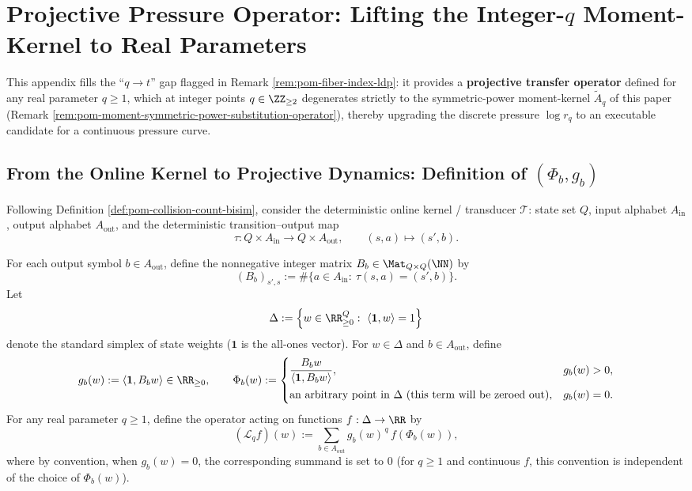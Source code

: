 \section{Projective Pressure Operator: Lifting the Integer-\texorpdfstring{$q$}{q} Moment-Kernel to Real Parameters}\label{app:pom-projective-pressure-operator}

This appendix fills the ``\(q\to t\)'' gap flagged in Remark \ref{rem:pom-fiber-index-ldp}: it provides a \textbf{projective transfer operator} defined for any real parameter \(q\ge 1\), which at integer points \(q\in\ZZ_{\ge 2}\) degenerates strictly to the symmetric-power moment-kernel \(\widetilde A_q\) of this paper (Remark \ref{rem:pom-moment-symmetric-power-substitution-operator}), thereby upgrading the discrete pressure \(\log r_q\) to an executable candidate for a continuous pressure curve.

\subsection{From the Online Kernel to Projective Dynamics: Definition of \texorpdfstring{$(\Phi_b,g_b)$}{(Phi,g)}}
Following Definition \ref{def:pom-collision-count-bisim}, consider the deterministic online kernel / transducer \(\mathcal{T}\): state set \(Q\), input alphabet \(A_{\mathrm{in}}\), output alphabet \(A_{\mathrm{out}}\), and the deterministic transition--output map
\[
\tau:Q\times A_{\mathrm{in}}\to Q\times A_{\mathrm{out}},\qquad (s,a)\mapsto (s',b).
\]

\begin{definition}\label{def:pom-projective-transfer-operator}
For each output symbol \(b\in A_{\mathrm{out}}\), define the nonnegative integer matrix \(B_b\in\Mat_{Q\times Q}(\NN)\) by
\[
(B_b)_{s',s}:=\#\{a\in A_{\mathrm{in}}:\ \tau(s,a)=(s',b)\}.
\]
Let
\[
\Delta:=\Bigl\{w\in\RR_{\ge 0}^{Q}:\ \langle \mathbf{1},w\rangle=1\Bigr\}
\]
denote the standard simplex of state weights (\(\mathbf{1}\) is the all-ones vector).
For \(w\in\Delta\) and \(b\in A_{\mathrm{out}}\), define
\[
g_b(w):=\langle \mathbf{1},B_b w\rangle\in\RR_{\ge 0},
\qquad
\Phi_b(w):=
\begin{cases}
\dfrac{B_b w}{\langle \mathbf{1},B_b w\rangle},& g_b(w)>0,\\[8pt]
\text{an arbitrary point in }\Delta\text{ (this term will be zeroed out)},& g_b(w)=0.
\end{cases}
\]
For any real parameter \(q\ge 1\), define the operator acting on functions \(f:\Delta\to\RR\) by
\[
(\mathcal{L}_q f)(w):=\sum_{b\in A_{\mathrm{out}}} g_b(w)^{\,q}\, f(\Phi_b(w)),
\]
where by convention, when \(g_b(w)=0\), the corresponding summand is set to \(0\) (for \(q\ge 1\) and continuous \(f\), this convention is independent of the choice of \(\Phi_b(w)\)).
\end{definition}


